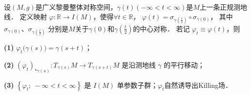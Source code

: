 \begin{theorem}\label{chhss:thm_SS1SG}
设$(M, g)$是广义黎曼整体对称空间，$\gamma(t)(-\infty<t<\infty)$是$M$上一条正规测地线．
定义映射 $\varphi: \mathbb{R} \rightarrow I(M)$，使得$\forall t\in \mathbb{R}$，
$\varphi(t)=\sigma_{\gamma(\frac{t}{2})} \circ \sigma_{\gamma(0)}$，
其中 $\sigma_{\gamma(0)}$、$ \sigma_{\gamma(\frac{t}{2})}$
分别是$M$关于$\gamma(0)$和$\gamma(\frac{t}{2})$的中心对称．
若记 $\varphi_t\equiv\varphi(t)$，则

{\bfseries (1)} $\varphi_t\bigl(\gamma(s)\bigr)=\gamma(s+t)$；

{\bfseries (2)} $\left(\varphi_t\right)_{* \gamma(s)}: T_{\gamma(s)} M \rightarrow T_{\gamma(s+t)} M$ 是沿测地线 $\gamma$ 的平行移动；

{\bfseries (3)} $\left\{\varphi_t ;\  -\infty<t<\infty\right\}$ 是 $I(M)$ 单参数子群；$\varphi_t$自然诱导出Killing场．
\end{theorem}
